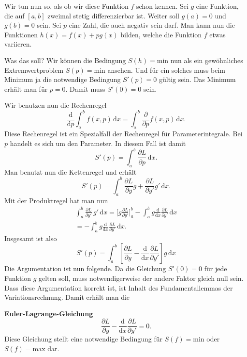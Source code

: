 \documentclass[a4paper,10pt,fleqn,twocolumn,twoside]{article}
\numberwithin{equation}{section}
\begin{document}
Wir tun nun so, als ob wir diese Funktion $f$ schon kennen.
Sei $g$ eine Funktion, die auf $[a,b]$ zweimal stetig
differenzierbar ist. Weiter soll $g(a)=0$ und $g(b)=0$
sein. Sei $p$ eine Zahl, die auch negativ sein darf. Man
kann nun die Funktionen $h(x)=f(x)+pg(x)$ bilden, welche
die Funktion $f$ etwas variieren.

Was das soll? Wir können die Bedingung $S(h)=\mathrm{min}$ nun als
ein gewöhnliches Extremwertproblem $S(p)=\mathrm{min}$ ansehen.
Und für ein solches muss beim Minimum ja die notwendige Bedingung
$S'(p)=0$ gültig sein. Das Minimum erhält man für $p=0$.
Damit muss $S'(0)=0$ sein.

Wir benutzen nun die Rechenregel
\begin{equation}
\frac{\mathrm d}{\mathrm dp}\int_a^b f(x,p)\,\mathrm dx =
\int_a^b \frac{\partial}{\partial p}f(x,p)\,\mathrm dx.
\end{equation}
Diese Rechenregel ist ein Spezialfall der Rechenregel für
Parameterintegrale. Bei $p$ handelt es sich um den Parameter.
In diesem Fall ist damit
\begin{equation}
S'(p) = \int_a^b \frac{\partial L}{\partial p}\,\mathrm dx.
\end{equation}
Man benutzt nun die Kettenregel und erhält
\begin{equation}
S'(p) = \int_a^b \frac{\partial L}{\partial y}g
  +\frac{\partial L}{\partial y'}g'\,\mathrm dx.
\end{equation}
Mit der Produktregel hat man nun
\begin{gather*}
\int_a^b \frac{\partial L}{\partial y'}\,g'\,\mathrm dx
= \Big[g\frac{\partial L}{\partial y'}\Big]_a^b
- \int_a^b g \frac{\mathrm d}{\mathrm dx}
\frac{\partial L}{\partial y'}\,\mathrm dx\\
= - \int_a^b g \frac{\mathrm d}{\mathrm dx}
\frac{\partial L}{\partial y'}\,\mathrm dx.
\end{gather*}
Insgesamt ist also
\begin{equation}
S'(p) = \int_a^b \left[\frac{\partial L}{\partial y}
-\frac{\mathrm d}{\mathrm dx}\frac{\partial L}{\partial y'}
\right]g\,\mathrm dx
\end{equation}
Die Argumentation ist nun folgende. Da die Gleichung $S'(0)=0$
für jede Funktion $g$ gelten soll, muss notwendigerweise der andere
Faktor gleich null sein. Dass diese Argumentation korrekt ist, ist
Inhalt des Fundamentallemmas der Variationsrechnung.
Damit erhält man die

\textbf{Euler-Lagrange-Gleichung}
\begin{equation}
\frac{\partial L}{\partial y}
-\frac{\mathrm d}{\mathrm dx}\frac{\partial L}{\partial y'}
=0.
\end{equation}
Diese Gleichung stellt eine notwendige Bedingung für
$S(f)=\mathrm{min}$ oder $S(f)=\mathrm{max}$ dar.
\end{document}
